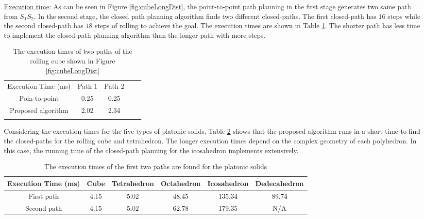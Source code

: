 
\noindent \uline{Execution time}:
As can be seen in Figure \ref{fig:cubeLongDist}, the point-to-point path planning in the first stage generates two same path from $S_1S_2$. In the second stage, the closed path planning algorithm finds two different closed-paths. The first closed-path has $16$ steps while the second closed-path has $18$ steps of rolling to achieve the goal.
The execution times are shown in Table \ref{tab:timeCubeExtension}. The shorter path has less time to implement the closed-path planning algorithm than the longer path with more steps.\\

\begin{table}[H]
\caption{The execution times of two paths of the rolling cube shown in Figure \ref{fig:cubeLongDist}}
\centering
\begin{tabular}{cccll}
\cline{1-3}
\multicolumn{1}{|c|}{Execution Time (ms)}          & \multicolumn{1}{c|}{Path 1} & \multicolumn{1}{c|}{Path 2} &  &  \\ \cline{1-3}
\multicolumn{1}{|c|}{Poin-to-point} & \multicolumn{1}{c|}{0.25}    & \multicolumn{1}{c|}{0.25}    &  &  \\ \cline{1-3}
\multicolumn{1}{|c|}{Proposed algorithm} & \multicolumn{1}{c|}{2.02} & \multicolumn{1}{c|}{2.34} &  &  \\ \cline{1-3}
\multicolumn{1}{l}{}                & \multicolumn{1}{l}{}        & \multicolumn{1}{l}{}        &  & 
\end{tabular}
\label{tab:timeCubeExtension}
\end{table}


\noindent Considering the execution times for the five types of platonic solids, Table \ref{tab:twoPathsPlatonics} shows that the proposed algorithm runs in a short time to find the closed-paths for the rolling cube and tetrahedron. 
The longer execution times depend on the complex geometry of each polyhedron. In this case, the running time of the closed-path planning for the icosahedron implements extensively. \\


\begin{table}[H]
\centering
\caption{The execution times of the first two paths are found for the platonic solids}
\begin{tabular}{|c|c|c|c|c|c|}
\hline
Execution Time (ms) & Cube & Tetrahedron & Octahedron & Icosahedron & Dedecahedron \\ \hline
First path          & 4.15 & 5.02 & 48.45 & 135.34 & 89.74 \\ \hline
Second path         & 4.15 & 5.02 & 62.78 & 179.35 & N/A          \\ \hline
\end{tabular}
\label{tab:twoPathsPlatonics}
\end{table}